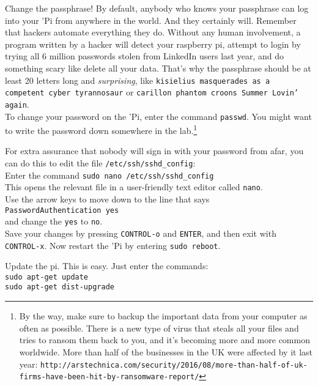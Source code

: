 \documentclass{article}
\begin{document}
\item Change the passphrase! By default, anybody who knows your passphrase can log
  into your 'Pi from anywhere in the world. And they certainly will. Remember that
  hackers automate everything they do. Without any human involvement, a program
  written by a hacker will detect your raspberry pi, attempt to login by trying all
  6 million passwords stolen from LinkedIn users last year, and do something
  scary like delete all your data. That's why the passphrase should be at least
  20 letters long and \emph{surprising}, like
  \texttt{kisielius masquerades as a competent cyber tyrannosaur} or
  \texttt{carillon phantom croons Summer Lovin' again}.\\
  To change your password on the 'Pi, enter the command \texttt{passwd}.
  You might want to write the password down somewhere in the lab.\footnote{By
    the way, make sure to backup the important data from
    your computer as often as possible. There is a new type of virus
    that steals all your files and tries to ransom them back to you,
    and it's becoming more and
    more common worldwide. More than half of the businesses in the UK
    were affected by it last year:
    \texttt{http://arstechnica.com/security/2016/08/more-than-half-of-uk-firms-have-been-hit-by-ransomware-report/}
  }

  For extra assurance that nobody will sign in with your password from afar,
  you can do this to edit the file \texttt{/etc/ssh/sshd_config}:\\
  Enter the command \texttt{sudo nano /etc/ssh/sshd_config}\\
  This opens the relevant file in a user-friendly text editor called
  \texttt{nano}.\\
  Use the arrow keys to move down to the line that says\\
  \texttt{PasswordAuthentication yes}\\
  and change the \texttt{yes} to \texttt{no}.\\
  Save your changes by pressing \texttt{CONTROL-o} and \texttt{ENTER}, and
  then exit with \texttt{CONTROL-x}.
  Now restart the 'Pi by entering \texttt{sudo reboot}.


\item Update the pi. This is easy. Just enter the commands:\\
  \texttt{sudo apt-get update}\\
  \texttt{sudo apt-get dist-upgrade}\\
\end{document}

